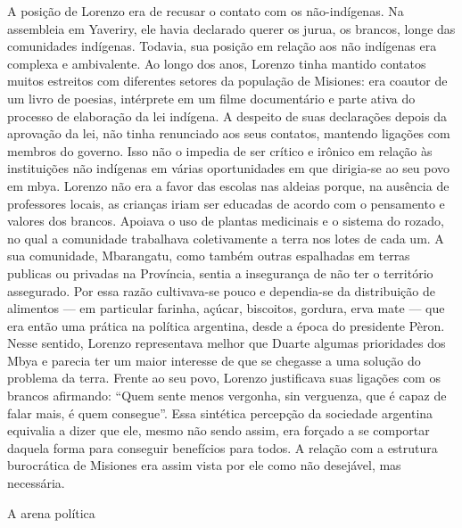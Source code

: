 \documentclass{article}
\begin{document}
A posi\c{c}\~ao de Lorenzo era de recusar o contato com os
n\~ao-ind\'igenas. Na assembleia em Yaveriry, ele havia declarado
querer os jurua, os brancos, longe das comunidades ind\'igenas.
Todavia, sua posi\c{c}\~ao em rela\c{c}\~ao aos n\~ao ind\'igenas era
complexa e ambivalente. Ao longo dos anos, Lorenzo tinha mantido
contatos muitos estreitos com diferentes setores da popula\c{c}\~ao de
Misiones: era coautor de um livro de poesias, int\'erprete em um filme
document\'ario e parte ativa do processo de elabora\c{c}\~ao da lei
ind\'igena. A despeito de suas declara\c{c}\~oes depois da
aprova\c{c}\~ao da lei, n\~ao tinha renunciado aos seus contatos,
mantendo liga\c{c}\~oes com membros do governo. Isso n\~ao o impedia de
ser cr\'itico e ir\^onico em rela\c{c}\~ao \`as institui\c{c}\~oes
n\~ao ind\'igenas em v\'arias oportunidades em que dirigia-se ao seu
povo em mbya. Lorenzo n\~ao era a favor das escolas nas aldeias porque,
na aus\^encia de professores locais, as crian\c{c}as iriam ser educadas
de acordo com o pensamento e valores dos brancos. Apoiava o uso de
plantas medicinais e o sistema do rozado, no qual a comunidade
trabalhava coletivamente a terra nos lotes de cada um. A sua
comunidade, Mbarangatu, como tamb\'em outras espalhadas em terras
publicas ou privadas na Prov\'incia, sentia a inseguran\c{c}a de n\~ao
ter o territ\'orio assegurado. Por essa raz\~ao cultivava-se pouco e
dependia-se da distribui\c{c}\~ao de alimentos --- em particular
farinha, a\c{c}\'ucar, biscoitos, gordura, erva mate --- que era
ent\~ao uma pr\'atica na pol\'itica argentina, desde a \'epoca do
presidente P\`eron. Nesse sentido, Lorenzo representava melhor que
Duarte algumas prioridades dos Mbya e parecia ter um maior interesse de
que se chegasse a uma solu\c{c}\~ao do problema da terra. Frente ao seu
povo, Lorenzo justificava suas liga\c{c}\~oes com os brancos afirmando:
{\textquotedblleft}Quem sente menos vergonha, sin verguenza, que \'e
capaz de falar mais, \'e quem consegue{\textquotedblright}. Essa
sint\'etica percep\c{c}\~ao da sociedade argentina equivalia a dizer
que ele, mesmo n\~ao sendo assim, era for\c{c}ado a se comportar
daquela forma para conseguir benef\'icios para todos. A rela\c{c}\~ao
com a estrutura burocr\'atica de Misiones era assim vista por ele como
n\~ao desej\'avel, mas necess\'aria.

A arena pol\'itica  
\end{document}

